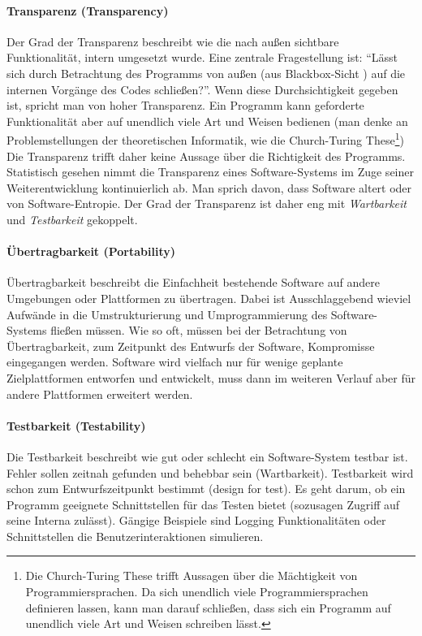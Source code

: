 \paragraph{Transparenz (Transparency)} Der Grad der Transparenz beschreibt wie die nach außen sichtbare Funktionalität, intern umgesetzt wurde. Eine zentrale Fragestellung ist: ``Lässt sich durch Betrachtung des Programms von außen (aus Blackbox-Sicht ) auf die internen Vorgänge des Codes schließen?''. Wenn diese Durchsichtigkeit gegeben ist, spricht man von hoher Transparenz. Ein Programm kann geforderte Funktionalität aber auf unendlich viele Art und Weisen bedienen (man denke an Problemstellungen der theoretischen Informatik, wie die Church-Turing These\footnote{Die Church-Turing These trifft Aussagen über die Mächtigkeit von Programmiersprachen. \cite{hoffmann_theoretische_2011} Da sich unendlich viele Programmiersprachen definieren lassen, kann man darauf schließen, dass sich ein Programm auf unendlich viele Art und Weisen schreiben lässt.}) Die Transparenz trifft daher keine Aussage über die Richtigkeit des Programms. Statistisch gesehen nimmt die Transparenz eines Software-Systems im Zuge seiner Weiterentwicklung kontinuierlich ab.\cite{hoffmann_software-qualitat_2013} Man sprich davon, dass Software altert oder von Software-Entropie. Der Grad der Transparenz ist daher eng mit \textit{Wartbarkeit} und \textit{Testbarkeit} gekoppelt. 

\paragraph{Übertragbarkeit (Portability)} Übertragbarkeit beschreibt die Einfachheit bestehende Software auf andere Umgebungen oder Plattformen zu übertragen. Dabei ist Ausschlaggebend wieviel Aufwände in die Umstrukturierung und Umprogrammierung des Software-Systems fließen müssen. Wie so oft, müssen bei der Betrachtung von Übertragbarkeit, zum Zeitpunkt des Entwurfs der Software, Kompromisse eingegangen werden. Software wird vielfach nur für wenige geplante Zielplattformen entworfen und entwickelt, muss dann im weiteren Verlauf aber für andere Plattformen erweitert werden.

\paragraph{Testbarkeit (Testability)} Die Testbarkeit beschreibt wie gut oder schlecht ein Software-System testbar ist. Fehler sollen zeitnah gefunden und behebbar sein (Wartbarkeit). Testbarkeit wird schon zum Entwurfszeitpunkt bestimmt (design for test). Es geht darum, ob ein Programm geeignete Schnittstellen für das Testen bietet (sozusagen Zugriff auf seine Interna zulässt). Gängige Beispiele sind Logging Funktionalitäten oder Schnittstellen die Benutzerinteraktionen simulieren.

